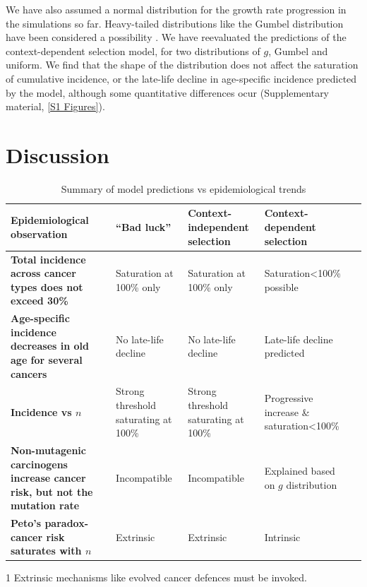 \documentclass[10pt,twocolumn,twoside]{article}
\begin{document}
We have also assumed a normal distribution for the growth rate progression in the simulations so far. Heavy-tailed distributions like the Gumbel distribution have been considered a possibility \cite{Durrett2010}. We have reevaluated the predictions of the context-dependent selection model, for two distributions of $g$, Gumbel and uniform. We find that the shape of the distribution does not affect the saturation of cumulative incidence, or the late-life decline in age-specific incidence predicted by the model, although some quantitative differences ocur (Supplementary material, \ref{S1 Figures}).

\section{Discussion}

\begin{table}[tbhp]
\centering
\begin{threeparttable}
\begin{tabular}{p{5cm}p{4cm}p{4cm}p{3.5cm}p{7cm}}
\textbf{Epidemiological observation} & ``Bad luck'' & Context-independent selection & Context-dependent selection \\
\hline
\textbf{Total incidence across cancer types does not exceed 30\%} & Saturation at 100\% only & Saturation at 100\% only & Saturation<100\% possible \\
\textbf{Age-specific incidence decreases in old age for several cancers} & No late-life decline & No late-life decline & Late-life decline predicted \\
\textbf{Incidence vs $n$} & Strong threshold saturating at 100\% & Strong threshold saturating at 100\% & Progressive increase \& saturation<100\% \\
\textbf{Non-mutagenic carcinogens increase cancer risk, but not the mutation rate} & Incompatible & Incompatible & Explained based on $g$ distribution \\
\textbf{Peto's paradox-cancer risk saturates with $n$} & Extrinsic\tnote{1} & Extrinsic\tnote{1} & Intrinsic \\
\hline
\end{tabular}
\begin{tablenotes}
\item[1] \small{Extrinsic mechanisms like evolved cancer defences must be invoked.}
\end{tablenotes}
\caption{Summary of model predictions vs epidemiological trends}
\end{threeparttable}
\label{Table 1}
\end{table}
\end{document}
